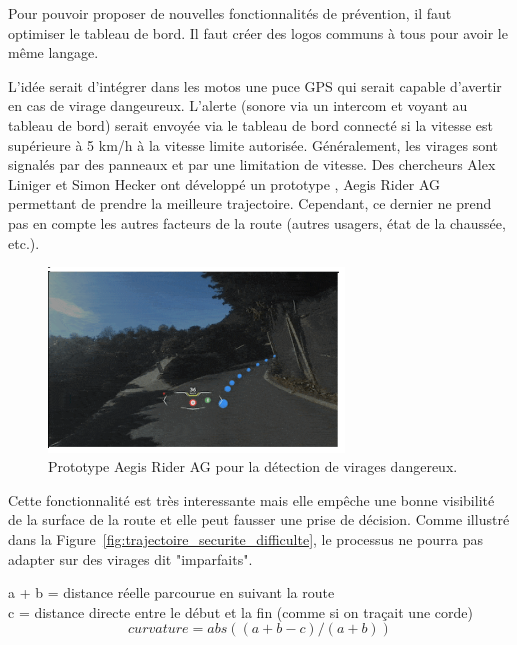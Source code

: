 Pour pouvoir proposer de nouvelles fonctionnalités de prévention, il faut optimiser le tableau de bord. Il faut créer des logos communs à tous pour avoir le même langage. 

L'idée serait d'intégrer dans les motos une puce GPS qui serait capable d'avertir en cas de virage dangeureux. L'alerte (sonore via un intercom et voyant au tableau de bord) serait envoyée via le tableau de bord connecté si la vitesse est supérieure à 5 km/h à la vitesse limite autorisée. Généralement, les virages sont signalés par des panneaux et par une limitation de vitesse. Des chercheurs Alex Liniger et Simon Hecker ont développé un prototype , Aegis Rider AG\cite{vitesse_virage_mcnews} permettant de prendre la meilleure trajectoire. Cependant, ce dernier ne prend pas en compte les autres facteurs de la route (autres usagers, état de la chaussée, etc.). 

\begin{figure}[h]
    \centering
    \includegraphics[width=0.7\textwidth]{coeur_memoire/images/aegis.png} 
    \caption{Prototype Aegis Rider AG pour la détection de virages dangereux.}
\end{figure}
Cette fonctionnalité est très interessante mais elle empêche une bonne visibilité de la surface de la route et elle peut fausser une prise de décision.
Comme illustré dans la Figure~\ref{fig:trajectoire_securite_difficulte}, le processus ne pourra pas adapter sur des virages dit "imparfaits".





\begin{tcolorbox}[title=Calcul de la courbure]
a + b = distance réelle parcourue en suivant la route \\
c = distance directe entre le début et la fin (comme si on traçait une corde)
\[
curvature = abs((a + b - c) / (a + b))
\]
\end{tcolorbox}




